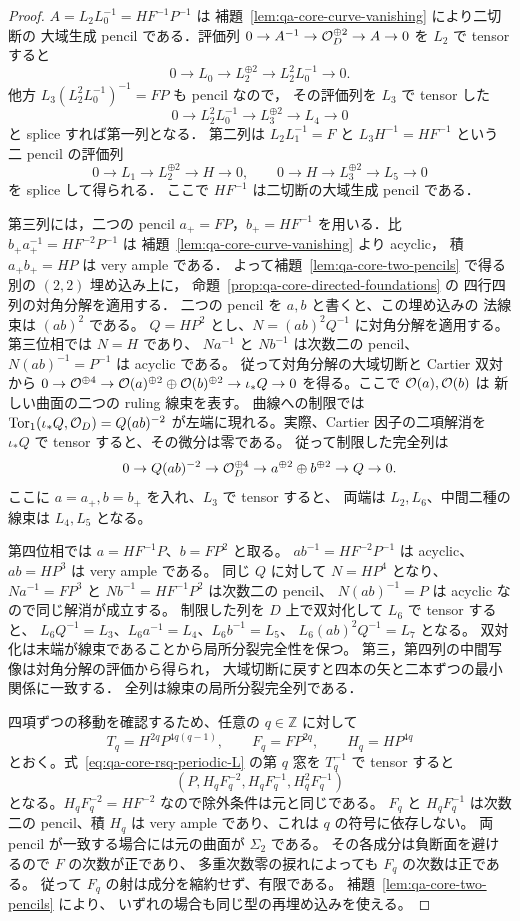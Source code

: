 \begin{proof}
$A=L_2L_0^{-1}=HF^{-1}P^{-1}$ は
補題~\ref{lem:qa-core-curve-vanishing} により二切断の
大域生成 pencil である．評価列
$0\to A^{-1}\to\mathcal O_D^{\oplus2}\to A\to0$
を $L_2$ で tensor すると
\[
0\to L_0\to L_2^{\oplus2}\to L_2^2L_0^{-1}\to0 .
\]
他方 $L_3(L_2^2L_0^{-1})^{-1}=FP$ も pencil なので，
その評価列を $L_3$ で tensor した
\[
0\to L_2^2L_0^{-1}\to L_3^{\oplus2}\to L_4\to0
\]
と splice すれば第一列となる．
第二列は $L_2L_1^{-1}=F$ と
$L_3H^{-1}=HF^{-1}$ という二 pencil の評価列
\[
0\to L_1\to L_2^{\oplus2}\to H\to0,\qquad
0\to H\to L_3^{\oplus2}\to L_5\to0
\]
を splice して得られる．
ここで $HF^{-1}$ は二切断の大域生成 pencil である．

第三列には，二つの pencil $a_+=FP$，$b_+=HF^{-1}$
を用いる．比 $b_+a_+^{-1}=HF^{-2}P^{-1}$ は
補題~\ref{lem:qa-core-curve-vanishing} より acyclic，
積 $a_+b_+=HP$ は very ample である．
よって補題~\ref{lem:qa-core-two-pencils} で得る
別の $(2,2)$ 埋め込み上に，
命題~\ref{prop:qa-core-directed-foundations} の
四行四列の対角分解を適用する．
二つの pencil を $a,b$ と書くと、この埋め込みの
法線束は $(ab)^2$ である。
$Q=HP^2$ とし、$N=(ab)^2Q^{-1}$ に対角分解を適用する。
第三位相では $N=H$ であり、
$Na^{-1}$ と $Nb^{-1}$ は次数二の pencil、
$N(ab)^{-1}=P^{-1}$ は acyclic である。
従って対角分解の大域切断と Cartier 双対から
$0\to\mathcal O^{\oplus4}\to\mathcal O(a)^{\oplus2}\oplus\mathcal O(b)^{\oplus2}
\to\iota_*Q\to0$ を得る。ここで $\mathcal O(a),\mathcal O(b)$ は
新しい曲面の二つの ruling 線束を表す。
曲線への制限では $\operatorname{Tor}_1(\iota_*Q,\mathcal O_D)=Q(ab)^{-2}$
が左端に現れる。実際、Cartier 因子の二項解消を
$\iota_*Q$ で tensor すると、その微分は零である。
従って制限した完全列は
\[
 0\to Q(ab)^{-2}\to\mathcal O_D^{\oplus4}\to
 a^{\oplus2}\oplus b^{\oplus2}\to Q\to0 .
\]
ここに $a=a_+,b=b_+$ を入れ、$L_3$ で tensor すると、
両端は $L_2,L_6$、中間二種の線束は $L_4,L_5$ となる。

第四位相では $a=HF^{-1}P$、$b=FP^2$ と取る。
$a b^{-1}=HF^{-2}P^{-1}$ は acyclic、$ab=HP^3$ は very ample である。
同じ $Q$ に対して $N=HP^4$ となり、
$Na^{-1}=FP^3$ と $Nb^{-1}=HF^{-1}P^2$ は次数二の pencil、
$N(ab)^{-1}=P$ は acyclic なので同じ解消が成立する。
制限した列を $D$ 上で双対化して $L_6$ で tensor すると、
$L_6Q^{-1}=L_3$、$L_6a^{-1}=L_4$、$L_6b^{-1}=L_5$、
$L_6(ab)^2Q^{-1}=L_7$ となる。
双対化は末端が線束であることから局所分裂完全性を保つ。
第三，第四列の中間写像は対角分解の評価から得られ，
大域切断に戻すと四本の矢と二本ずつの最小関係に一致する．
全列は線束の局所分裂完全列である．

四項ずつの移動を確認するため、任意の $q\in\mathbb Z$ に対して
\[
 T_q=H^{2q}P^{4q(q-1)},\qquad F_q=FP^{2q},\qquad H_q=HP^{4q}
\]
とおく。式~\eqref{eq:qa-core-rsq-periodic-L} の第 $q$ 窓を
$T_q^{-1}$ で tensor すると
\[
 (P,H_qF_q^{-2},H_qF_q^{-1},H_q^2F_q^{-1})
\]
となる。$H_qF_q^{-2}=HF^{-2}$ なので除外条件は元と同じである。
$F_q$ と $H_qF_q^{-1}$ は次数二の pencil、積 $H_q$ は
very ample であり、これは $q$ の符号に依存しない。
両 pencil が一致する場合には元の曲面が $\Sigma_2$ である。
その各成分は負断面を避けるので $F$ の次数が正であり、
多重次数零の捩れによっても $F_q$ の次数は正である。
従って $F_q$ の射は成分を縮約せず、有限である。
補題~\ref{lem:qa-core-two-pencils} により、
いずれの場合も同じ型の再埋め込みを使える。


\end{proof}
